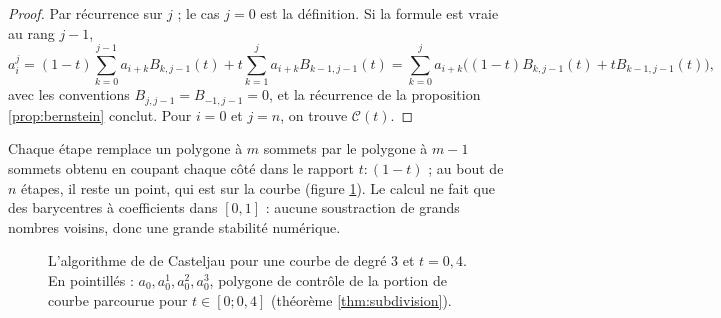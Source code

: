 \documentclass[11pt,a4paper]{article}
\theoremstyle{plain}
\theoremstyle{definition}
\theoremstyle{remark}
\newcommand{\C}{\mathcal{C}}
\begin{document}
\begin{proof}
Par récurrence sur $j$ ; le cas $j=0$ est la définition. Si la formule est vraie au rang $j-1$,
\[
  a_i^j=(1-t)\sum_{k=0}^{j-1}a_{i+k}B_{k,j-1}(t)+t\sum_{k=1}^{j}a_{i+k}B_{k-1,j-1}(t)
  =\sum_{k=0}^ja_{i+k}\big((1-t)B_{k,j-1}(t)+tB_{k-1,j-1}(t)\big),
\]
avec les conventions $B_{j,j-1}=B_{-1,j-1}=0$, et la récurrence de la proposition \ref{prop:bernstein} conclut. Pour $i=0$ et $j=n$, on trouve $\C(t)$.
\end{proof}

Chaque étape remplace un polygone à $m$ sommets par le polygone à $m-1$ sommets obtenu en coupant chaque côté dans le rapport $t:(1-t)$ ; au bout de $n$ étapes, il reste un point, qui est sur la courbe (figure \ref{fig:casteljau}). Le calcul ne fait que des barycentres à coefficients dans $[0,1]$ : aucune soustraction de grands nombres voisins, donc une grande stabilité numérique.

\begin{figure}[h]
\centering
{}
\caption{L'algorithme de de Casteljau pour une courbe de degré $3$ et $t=0{,}4$. En pointillés : $a_0,a_0^1,a_0^2,a_0^3$, polygone de contrôle de la portion de courbe parcourue pour $t\in[0;0{,}4]$ (théorème \ref{thm:subdivision}).}\label{fig:casteljau}
\end{figure}
\end{document}
